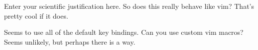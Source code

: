 %
%
\justification          %

Enter your scientific justification here. So does this really behave like vim? That's pretty cool if it does.

Seems to use all of the default key bindings. Can you use custom vim macros? Seems unlikely, but perhaps there is a way.